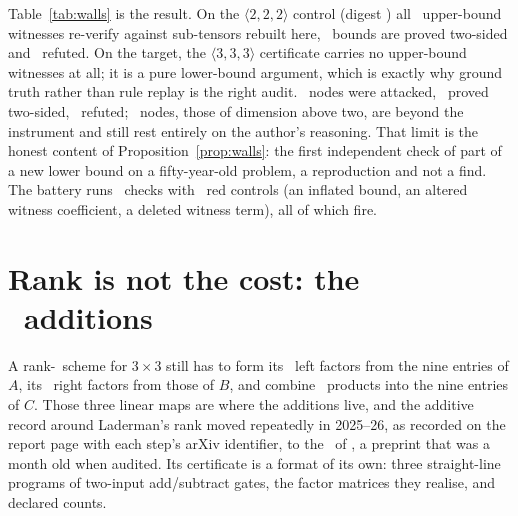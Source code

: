 \documentclass[11pt]{article}
\newcommand{\mm}[3]{\langle #1,#2,#3\rangle}
\begin{document}
\begin{table}[h]\centering\small
{}
\caption{Both of Wang's certificates, re-run here (\LBSeconds\ s together). The control's root node is the
unconstrained $\mm222$ tensor with claimed bound $7$, optimal since \cite{Wi71}: a rank-$6$ decomposition
found there would have meant a broken search, not new mathematics.}\label{tab:walls}
\end{table}

Table~\ref{tab:walls} is the result. On the $\mm222$ control (digest \CPin) all \CWitnesses\ upper-bound
witnesses re-verify against sub-tensors rebuilt here, \CConfirmed\ bounds are proved two-sided and
\CRefuted\ refuted. On the target, the $\mm333$ certificate carries no upper-bound witnesses at all; it is
a pure lower-bound argument, which is exactly why ground truth rather than rule replay is the right audit.
\LBAttacked\ nodes were attacked, \LBConfirmed\ proved two-sided, \LBRefuted\ refuted; \LBNotAttacked\
nodes, those of dimension above two, are beyond the instrument and still rest entirely on the author's
reasoning. That limit is the honest content of Proposition~\ref{prop:walls}: the first independent check
of part of a new lower bound on a fifty-year-old problem, a reproduction and not a find. The battery runs
\LBBatteryChecks\ checks with \LBBatteryReds\ red controls (an inflated bound, an altered witness
coefficient, a deleted witness term), all of which fire.

\section{Rank is not the cost: the \AddCounted\ additions}\label{sec:add}

A rank-\AddRank\ scheme for $3\times3$ still has to form its \AddRank\ left factors from the nine entries of
$A$, its \AddRank\ right factors from those of $B$, and combine \AddRank\ products into the nine entries of
$C$. Those three linear maps are where the additions live, and the additive record around Laderman's rank
moved repeatedly in 2025--26, as recorded on the report page with each step's arXiv identifier, to the
\AddCounted\ of \cite{KI26}, a preprint that was a month old when audited. Its certificate is a format of
its own: three straight-line programs of two-input add/subtract gates, the factor matrices they realise, and
declared counts.
\end{document}
